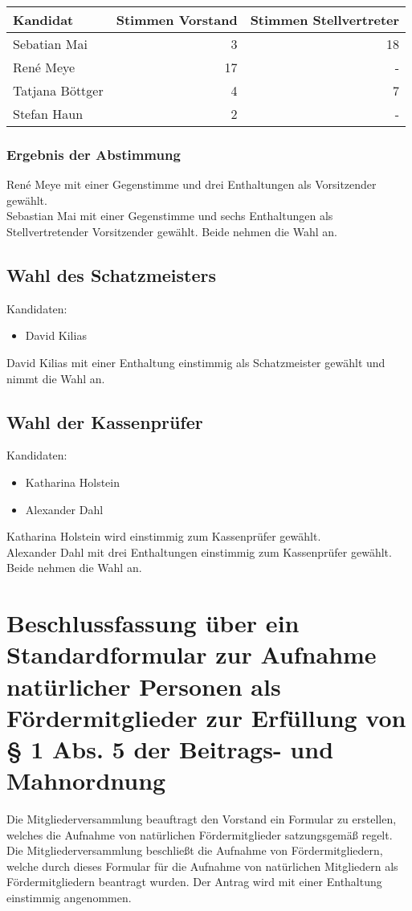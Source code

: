 \documentclass[a4paper,12pt,titlepage]{scrartcl}
\begin{document}
\begin{center}
	\begin{tabular}{l | r | r}
			Kandidat & Stimmen Vorstand & Stimmen Stellvertreter \\ \hline
			Sebatian Mai & 3 & 18 \\
			René Meye & 17 & - \\
			Tatjana Böttger & 4 & 7 \\
			Stefan Haun & 2 & - \\
		\end{tabular}
\end{center}

\subsubsection*{Ergebnis der Abstimmung}
René Meye mit einer Gegenstimme und drei Enthaltungen als Vorsitzender gewählt. \\
Sebastian Mai mit einer Gegenstimme und sechs Enthaltungen als Stellvertretender Vorsitzender gewählt.
Beide nehmen die Wahl an.

\subsection{Wahl des Schatzmeisters}
Kandidaten:
\begin{itemize}
	\item David Kilias
\end{itemize}
David Kilias mit einer Enthaltung einstimmig als Schatzmeister gewählt und nimmt die Wahl an.

\subsection{Wahl der Kassenprüfer}
Kandidaten:
\begin{itemize}
  \item Katharina Holstein
  \item Alexander Dahl
\end{itemize}
Katharina Holstein wird einstimmig zum Kassenprüfer gewählt. \\
Alexander Dahl mit drei Enthaltungen einstimmig zum Kassenprüfer gewählt. Beide nehmen die Wahl an.

\section{Beschlussfassung über ein Standardformular zur Aufnahme natürlicher Personen als Fördermitglieder zur Erfüllung von § 1
Abs. 5 der Beitrags- und Mahnordnung}
Die Mitgliederversammlung beauftragt den Vorstand ein Formular zu erstellen,	welches die Aufnahme von natürlichen Fördermitglieder satzungsgemäß regelt.
Die Mitgliederversammlung beschließt die Aufnahme von Fördermitgliedern,	welche durch dieses Formular für die Aufnahme von natürlichen Mitgliedern als Fördermitgliedern beantragt wurden.
Der Antrag wird mit einer Enthaltung einstimmig angenommen.
\end{document}
